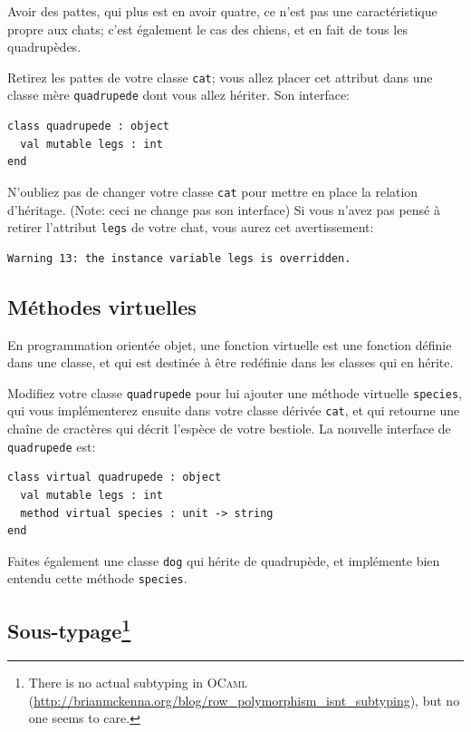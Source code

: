 \documentclass[a4paper]{article}
\begin{document}
Avoir des pattes, qui plus est en avoir quatre, ce n'est pas une
caractéristique propre aux chats; c'est également le cas des chiens, et en fait
de tous les quadrupèdes.

Retirez les pattes de votre classe \verb|cat|; vous allez placer cet attribut
dans une classe mère \verb|quadrupede| dont vous allez hériter. Son interface:

\begin{verbatim}
class quadrupede : object
  val mutable legs : int
end
\end{verbatim}

N'oubliez pas de changer votre classe \verb|cat| pour mettre en place la
relation d'héritage. (Note: ceci ne change pas son interface) Si vous n'avez
pas pensé à retirer l'attribut \verb|legs| de votre chat, vous aurez cet
avertissement:

\begin{verbatim}
Warning 13: the instance variable legs is overridden.
\end{verbatim}

\subsection{Méthodes virtuelles}

En programmation orientée objet, une fonction virtuelle est une fonction
définie dans une classe, et qui est destinée à être redéfinie dans les
classes qui en hérite.

Modifiez votre classe \verb|quadrupede| pour lui ajouter une méthode virtuelle
\verb|species|, qui vous implémenterez ensuite dans votre classe dérivée
\verb|cat|, et qui retourne une chaîne de cractères qui décrit l'espèce de
votre bestiole. La nouvelle interface de \verb|quadrupede| est:

\begin{verbatim}
class virtual quadrupede : object
  val mutable legs : int
  method virtual species : unit -> string
end
\end{verbatim}

Faites également une classe \verb|dog| qui hérite de quadrupède, et implémente
bien entendu cette méthode \verb|species|.

\subsection{Sous-typage\protect\footnote{There is no actual subtyping in
\textsc{OCaml}
(\protect\url{http://brianmckenna.org/blog/row\_polymorphism\_isnt\_subtyping}), but no one
seems to care.}}
\end{document}
